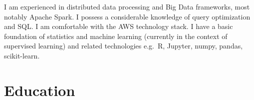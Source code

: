 \documentclass[letterpaper]{cv} %
\begin{document}
I am experienced in distributed data processing and Big Data frameworks, most notably Apache Spark. I possess a considerable knowledge of query optimization and SQL. I am comfortable with the AWS technology stack. I have a basic foundation of statistics and machine learning (currently in the context of supervised learning) and related technologies e.g.\ R, Jupyter, numpy, pandas, scikit-learn.


\section{Education}

\begin{twenty} %
\end{twenty}




\end{document}
